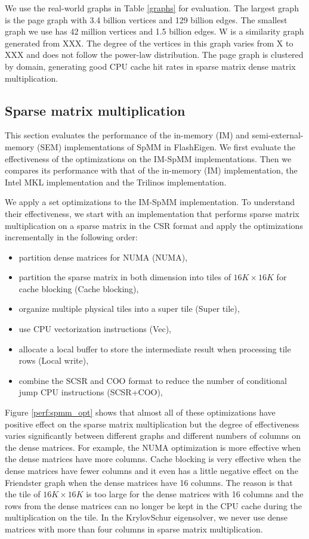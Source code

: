 We use the real-world graphs in Table \ref{graphs} for evaluation. The largest
graph is the page graph with 3.4 billion vertices and 129 billion edges.
The smallest graph we use has 42 million vertices and 1.5 billion edges.
W is a similarity graph generated from XXX. The degree of the vertices in
this graph varies from X to XXX and does not follow the power-law distribution.
The page graph is clustered by domain, generating good CPU cache hit rates
in sparse matrix dense matrix multiplication.

\subsection{Sparse matrix multiplication}
This section evaluates the performance of the in-memory (IM) and
semi-external-memory (SEM) implementations of SpMM in FlashEigen. We first
evaluate the effectiveness of the optimizations on the IM-SpMM implementations.
Then we compares its performance
with that of the in-memory (IM) implementation, the Intel MKL implementation
and the Trilinos implementation.

We apply a set optimizations to the IM-SpMM implementation. To understand
their effectiveness, we start with an implementation that performs sparse
matrix multiplication on a sparse matrix in the CSR format and apply
the optimizations incrementally in the following order:
\begin{itemize} \itemsep1pt \parskip0pt 
	\item partition dense matrices for NUMA (NUMA),
	\item partition the sparse matrix in both dimension into tiles of
		$16K \times 16K$ for cache blocking (Cache blocking),
	\item organize multiple physical tiles into a super tile (Super tile),
	\item use CPU vectorization instructions (Vec),
	\item allocate a local buffer to store the intermediate result when
		processing tile rows (Local write),
	\item combine the SCSR and COO format to reduce the number of conditional
		jump CPU instructions (SCSR+COO),
\end{itemize}
Figure \ref{perf:spmm_opt} shows that almost all of these optimizations have
positive effect
on the sparse matrix multiplication but the degree of effectiveness varies
significantly between different graphs and different numbers of columns on
the dense matrices. For example, the NUMA optimization is more effective when
the dense matrices have more columns. Cache blocking is very effective when
the dense matrices have fewer columns and it even has a little negative effect
on the Friendster graph when the dense matrices have 16 columns. The reason is
that the tile of $16K \times 16K$ is too large for the dense matrices with
16 columns and the rows from the dense matrices can no longer be kept in
the CPU cache during the multiplication on the tile. In the KrylovSchur
eigensolver, we never use dense matrices with more than four columns in
sparse matrix multiplication.

